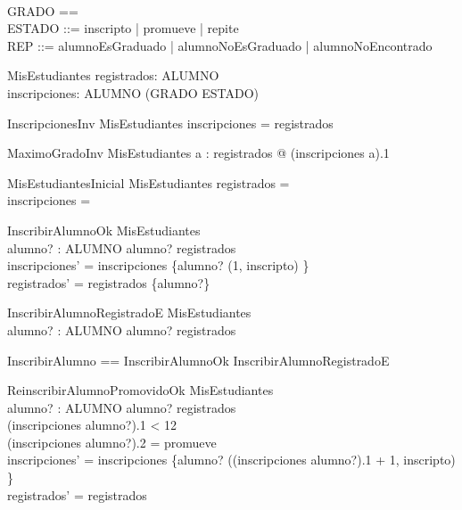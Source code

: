 \begin{zed}
    [ALUMNO] \\
    GRADO == \nat \\
    ESTADO ::= inscripto | promueve | repite \\
    REP ::= alumnoEsGraduado | alumnoNoEsGraduado | alumnoNoEncontrado
\end{zed}

\begin{schema}{MisEstudiantes}
    registrados: \power ALUMNO \\
    inscripciones: ALUMNO \pfun (GRADO \cross ESTADO)
\end{schema}

\begin{schema}{InscripcionesInv}
    MisEstudiantes
    \where
    \dom inscripciones = registrados
\end{schema}

\begin{schema}{MaximoGradoInv}
    MisEstudiantes
    \where
    \forall a : registrados @ (inscripciones \; a).1 
\end{schema}

\begin{schema}{MisEstudiantesInicial}
    MisEstudiantes
    \where
    registrados = \emptyset \\
    inscripciones = \emptyset
\end{schema}

\begin{schema}{InscribirAlumnoOk}
    \Delta MisEstudiantes \\
    alumno? : ALUMNO
    \where
    alumno? \notin registrados \\
    inscripciones' = inscripciones \cup \{alumno? \mapsto (1, inscripto) \} \\
    registrados' = registrados \cup \{alumno?\}
\end{schema}

\begin{schema}{InscribirAlumnoRegistradoE}
    \Xi MisEstudiantes \\
    alumno? : ALUMNO
    \where
    alumno? \in registrados
\end{schema}

\begin{zed}
    InscribirAlumno == InscribirAlumnoOk \lor InscribirAlumnoRegistradoE
\end{zed}

\begin{schema}{ReinscribirAlumnoPromovidoOk}
    \Delta MisEstudiantes \\
    alumno? : ALUMNO
    \where
    alumno? \in registrados \\
    (inscripciones \; alumno?).1 < 12 \\ 
    (inscripciones \; alumno?).2 = promueve \\
    inscripciones' = inscripciones \oplus \{alumno? \mapsto ((inscripciones \; alumno?).1 + 1, inscripto) \} \\
    registrados' = registrados
\end{schema}

